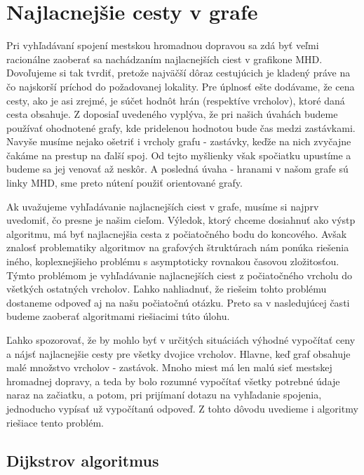 \section{Najlacnejšie cesty v grafe}

Pri vyhľadávaní spojení mestskou hromadnou dopravou sa zdá byť veľmi racionálne zaoberať sa nachádzaním najlacnejších ciest v grafikone MHD. Dovoľujeme si tak tvrdiť, pretože najväčší dôraz cestujúcich je kladený práve na čo najskorší príchod do požadovanej lokality. Pre úplnosť ešte dodávame, že cena cesty, ako je asi zrejmé, je súčet hodnôt hrán (respektíve vrcholov), ktoré daná cesta obsahuje. Z doposiaľ uvedeného vyplýva, že pri našich úvahách budeme používať ohodnotené grafy, kde pridelenou hodnotou bude čas medzi zastávkami. Navyše musíme nejako ošetriť i vrcholy grafu - zastávky, keďže na nich zvyčajne čakáme na prestup na ďalší spoj. Od tejto myšlienky však spočiatku upustíme a budeme sa jej venovať až neskôr. A posledná úvaha - hranami v našom grafe sú linky MHD, sme preto nútení použiť orientované grafy.\newline

Ak uvažujeme vyhľadávanie najlacnejších ciest v grafe, musíme si najprv uvedomiť, čo presne je našim cieľom. Výledok, ktorý chceme dosiahnuť ako výstp algoritmu, má byť najlacnejšia cesta z počiatočného bodu do koncového. Avšak znalosť problematiky algoritmov na grafových štruktúrach nám ponúka riešenia iného, koplexnejšieho problému s asymptoticky rovnakou časovou zložitosťou. Týmto problémom je vyhľadávanie najlacnejších ciest z počiatočného vrcholu do všetkých ostatných vrcholov. Ľahko nahliadnuť, že riešeim tohto problému dostaneme odpoveď aj na našu počiatočnú otázku.  Preto sa v nasledujúcej časti budeme zaoberať algoritmami riešiacimi túto úlohu.\newline

Ľahko spozorovať, že by mohlo byť v určitých situáciách výhodné vypočítať ceny a nájsť najlacnejšie cesty pre všetky dvojice vrcholov. Hlavne, keď graf obsahuje malé množstvo vrcholov - zastávok. Mnoho miest má len malú sieť mestskej hromadnej dopravy, a teda by bolo rozumné vypočítať všetky potrebné údaje naraz na začiatku, a potom, pri prijímaní dotazu na vyhľadanie spojenia, jednoducho vypísať už vypočítanú odpoveď. Z tohto dôvodu uvedieme i algoritmy riešiace tento problém.\newline


\subsection{Dijkstrov algoritmus}
\label{Dijkstra}

